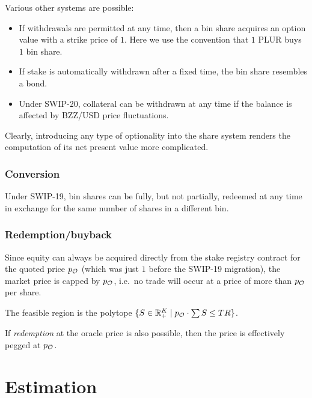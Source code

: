 Various other systems are possible:
%
\begin{itemize}
  \item 
    If withdrawals are permitted at any time, then a bin share acquires an option value with a strike price of $1$.
    Here we use the convention that $1$ PLUR buys $1$ bin share.

  \item
    If stake is automatically withdrawn after a fixed time, the bin share resembles a bond.

  \item
    Under SWIP-20, collateral can be withdrawn at any time if the balance is affected by BZZ/USD  price fluctuations.
    
\end{itemize}
%
Clearly, introducing any type of optionality into the share system renders the computation of its net present value more complicated.

\subsubsection{Conversion}

Under SWIP-19, bin shares can be fully, but not partially, redeemed at any time in exchange for the same number of shares in a different bin.

\subsubsection{Redemption/buyback}

Since equity can always be acquired directly from the stake registry contract for the quoted price $p_{\mathcal{O}}$ (which was just $1$ before the SWIP-19 migration), the market price is capped by $p_{\mathcal{O}}$, i.e.~no trade will occur at a price of more than $p_{\mathcal{O}}$ per share.

The feasible region is the polytope $\{S\in\mathbb{R}_+^K\mid p_{\mathcal{O}}\cdot\sum S \leq TR\}$.

If \emph{redemption} at the oracle price is also possible, then the price is effectively pegged at $p_{\mathcal{O}}$.


\newpage

\section{Estimation}
\label{section:estimation}

